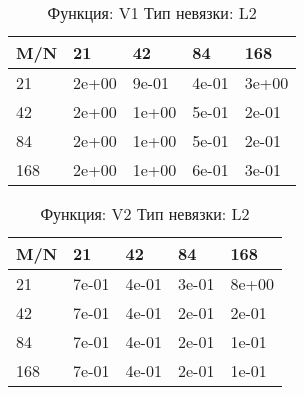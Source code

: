 \documentclass[a4paper,11pt]{article}
\begin{document}
\begin{table}[H]
\caption {Функция: V1 Тип невязки: L2  }
\begin{center}
\begin{tabular}{l|l|l|l|l}
\hline
M/N  & 21 & 42 & 84 & 168 \\ \hline
  21 & 2e+00& 9e-01& 4e-01& 3e+00\\ \hline
  42 & 2e+00& 1e+00& 5e-01& 2e-01\\ \hline
  84 & 2e+00& 1e+00& 5e-01& 2e-01\\ \hline
 168 & 2e+00& 1e+00& 6e-01& 3e-01\\ \hline
\end{tabular}
\end{center}
\end{table}
\begin{table}[H]
\caption {Функция: V2 Тип невязки: L2  }
\begin{center}
\begin{tabular}{l|l|l|l|l}
\hline
M/N  & 21 & 42 & 84 & 168 \\ \hline
  21 & 7e-01& 4e-01& 3e-01& 8e+00\\ \hline
  42 & 7e-01& 4e-01& 2e-01& 2e-01\\ \hline
  84 & 7e-01& 4e-01& 2e-01& 1e-01\\ \hline
 168 & 7e-01& 4e-01& 2e-01& 1e-01\\ \hline
\end{tabular}
\end{center}
\end{table}
\end{document}

